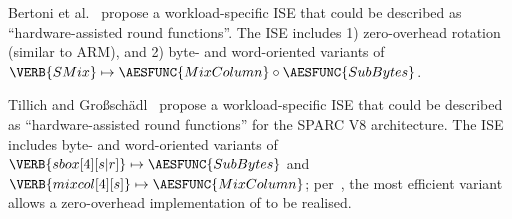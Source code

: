       Bertoni et al.~\cite{BBFR:06}
      propose 
      a workload-specific ISE
       that could be described as 
      ``hardware-assisted round functions''.
      The ISE includes
      1) zero-overhead rotation (similar to ARM),
         and
      2) byte- and word-oriented variants of
         $\VERB{SMix} \mapsto \AESFUNC{MixColumn} \circ \AESFUNC{SubBytes}$.
      
      Tillich and Gro{\ss}sch\"{a}dl~\cite{TilGro:06}
      propose 
      a workload-specific ISE
       that could be described as 
      ``hardware-assisted round functions'' for the SPARC V8 architecture.
      The ISE includes
         byte- and word-oriented variants of
         $\VERB  {sbox[4][s|r]} \mapsto \AESFUNC{SubBytes} $
         and
         $\VERB{mixcol[4][s]  } \mapsto \AESFUNC{MixColumn}$;
      per~\cite[Section 4.3]{TilGro:06},
      the most efficient variant allows
         a zero-overhead implementation of  to be realised.


